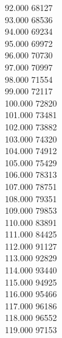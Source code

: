 { 92.000	68127 \\
 93.000	68536 \\
 94.000	69234 \\
 95.000	69972 \\
 96.000	70730 \\
 97.000	70997 \\
 98.000	71554 \\
 99.000	72117 \\
 100.000	72820 \\
 101.000	73481 \\
 102.000	73882 \\
 103.000	74320 \\
 104.000	74912 \\
 105.000	75429 \\
 106.000	78313 \\
 107.000	78751 \\
 108.000	79351 \\
 109.000	79853 \\
 110.000	83891 \\
 111.000	84425 \\
 112.000	91127 \\
 113.000	92829 \\
 114.000	93440 \\
 115.000	94925 \\
 116.000	95466 \\
 117.000	96186 \\
 118.000	96552 \\
 119.000	97153 \\
}
